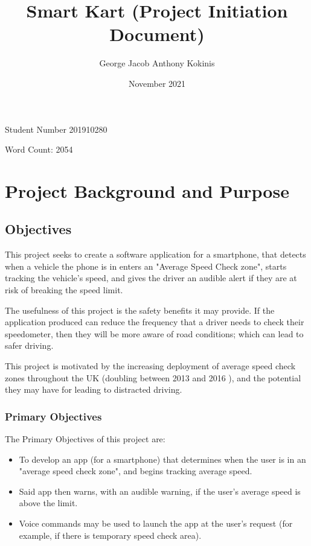 \documentclass[11pt, a4paper, notitlepage]{report}
\title{Smart Kart (Project Initiation Document)}
\date{November 2021}
\author{George Jacob Anthony Kokinis}
\begin{document}
\maketitle
\begin{center}
    Student Number 201910280
    
    Word Count: 2054 %
\end{center}
\newpage

\tableofcontents

\chapter{Project Background and Purpose}
\section{Objectives}
This project seeks to create a software application for a smartphone, that 
detects when a vehicle the phone is in enters an "Average Speed Check zone", 
starts tracking the vehicle's speed, and gives the driver an audible alert if 
they are at risk of breaking the speed limit.

The usefulness of this project is the safety benefits it may provide. If the 
application produced can reduce the frequency that a driver needs to check 
their speedometer, then they will be more aware of road conditions; which can 
lead to safer driving.

This project is motivated by the increasing deployment of average speed check 
zones throughout the UK (doubling between 2013 and 2016 
\citep{BBCSpeedCameraDoubled}), and the potential they may have for leading to 
distracted driving.

\subsection{Primary Objectives}\label{subsec:PrimaryObjectives}
The Primary Objectives of this project are:
\begin{itemize}
    \item To develop an app (for a smartphone) that determines when the user is 
    in an "average speed check zone", and begins tracking average speed.
    \item Said app then warns, with an audible warning, if the user's average 
    speed is above the limit.
    \item Voice commands may be used to launch the app at the user's request 
    (for example, if there is temporary speed check area).
\end{itemize}
\end{document}
